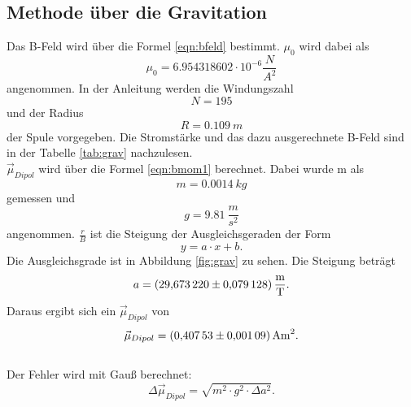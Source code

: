 \subsection{Methode über die Gravitation}
Das B-Feld wird über die Formel \eqref{eqn:bfeld} bestimmt. $\mu_{0}$ wird dabei als\\
\begin{equation*}
  \mu_{0} = \SI{6.954318602} \cdot 10^{-6} \si{ \frac{N}{A^2}}
\end{equation*}
 angenommen.
In der Anleitung werden die Windungszahl
\begin{equation*}
  N = 195
\end{equation*}
und der Radius
\begin{equation*}
  R = \SI{0.109}{m}
\end{equation*}
der Spule vorgegeben.
Die Stromstärke und das dazu ausgerechnete B-Feld sind in der Tabelle \ref{tab:grav} nachzulesen.\\
$\vec{\mu}_{Dipol}$ wird über die Formel \eqref{eqn:bmom1} berechnet.
Dabei wurde m als
\begin{equation*}
  m = \SI{0.0014}{kg}
\end{equation*}
gemessen und
\begin{equation*}
  g = \SI{9.81}{\frac{m}{s^2}}
\end{equation*}
angenommen.
$\frac{r}{B}$ ist die Steigung der Ausgleichsgeraden der Form
\begin{equation*}
  y = a \cdot x + b.
\end{equation*}
 Die Ausgleichsgrade ist in Abbildung \ref{fig:grav} zu sehen. Die Steigung beträgt
\begin{equation*}
  a=\SI{29.67322 \pm 0.079128}{\frac{m}{T}}.
\end{equation*}
Daraus ergibt sich ein $\vec{\mu}_{Dipol}$ von
\begin{equation*}
  \vec{\mu}_{Dipol} = \SI{0.40753 \pm 0.00109}{A m^2}.
\end{equation*}
\\Der Fehler wird mit Gauß berechnet:
\begin{equation*}
  \Delta \vec{\mu}_{Dipol}= \sqrt{m^2  \cdot g^2 \cdot \Delta a^2}.
\end{equation*}


